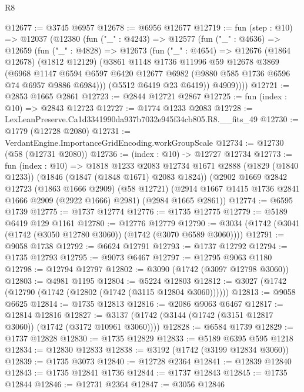 \begin{lexlean}{R8}
\begin{coremodule}
@12677 := @3745 @6957
@12678 := @6956 @12677
@12719 := fun (step : @10) =>
  @12037
    (@12380
      (fun ("_" : @4243) =>
      @12577
        (fun ("_" : @4636) =>
        @12659
          (fun ("_" : @4828) =>
          @12673
            (fun ("_" : @4654) =>
            @12676
              (@1864 @12678)
              (@1812 @12129)
              (@3861
                @1148
                @1736
                @11996
                @59
                @12678
                @3869
                (@6968
                  @1147
                  @6594
                  @6597
                  @6420
                  @12677
                  @6982
                  (@9880 @585 @1736 @6596 @74 @6957 @9886 @6984)))
              (@5512 @6419 @23 @6419))
            @4909))))
@12721 := @2853 @1665 @2861
@12723 := @2844 @12721 @2867
@12725 := fun (index : @10) => @2843 @12723
@12727 := @1774 @1233 @2083
@12728 := LexLeanPreserve.Ca1d3341990da937b7032e945f34cb805.R8.__fits_49
@12730 := @1779 (@12728 @2080)
@12731 := VerdantEngine.ImportanceGridEncoding.workGroupScale
@12734 := @12730 (@58 (@12731 @2080))
@12736 := (index : @10) -> @12727 @12734
@12773 := fun (index : @10) =>
  @1818
    @1233
    @2083
    @12734
    @1671
    @2888
    (@1829 (@1840 @1233))
    (@1846 (@1847 (@1848 @1671) @2083 @1824))
    (@2902
      @1669
      @2842
      @12723
      (@1863 @1666 @2909)
      (@58 @12721)
      (@2914 @1667 @1415 @1736 @2841 @1666 @2909 (@2922 @1666) @2981)
      (@2984 @1665 @2861))
@12774 := @6595 @1739
@12775 := @1737 @12774
@12776 := @1735 @12775
@12779 := @5189 @6419 @129 @1161
@12780 := @12776 @12779
@12790 := @3034 (@1742 (@3041 (@1742 (@3050 @12780 @3060)) (@1742 (@3070 @6589 @3060))))
@12791 := @9058 @1738
@12792 := @6624 @12791
@12793 := @1737 @12792
@12794 := @1735 @12793
@12795 := @9073 @6467
@12797 := @12795 @9063 @1180
@12798 := @12794 @12797
@12802 := @3090 (@1742 (@3097 @12798 @3060))
@12803 := @4981 @1195
@12804 := @5224 @12803
@12812 := @3027 (@1742 (@12790 (@1742 (@12802 (@1742 (@3115 @12804 @3060))))))
@12813 := @9058 @6625
@12814 := @1735 @12813
@12816 := @2086 @9063 @6467
@12817 := @12814 @12816
@12827 := @3137 (@1742 (@3144 (@1742 (@3151 @12817 @3060)) (@1742 (@3172 @10961 @3060))))
@12828 := @6584 @1739
@12829 := @1737 @12828
@12830 := @1735 @12829
@12833 := @5189 @6395 @595 @1218
@12834 := @12830 @12833
@12838 := @3192 (@1742 (@3199 @12834 @3060))
@12839 := @1735 @3073
@12840 := @12728 @2364
@12841 := @12839 @12840
@12843 := @1735 @12841 @1736
@12844 := @1737 @12843
@12845 := @1735 @12844
@12846 := @12731 @2364
@12847 := @3056 @12846

\end{coremodule}
\end{lexlean}
